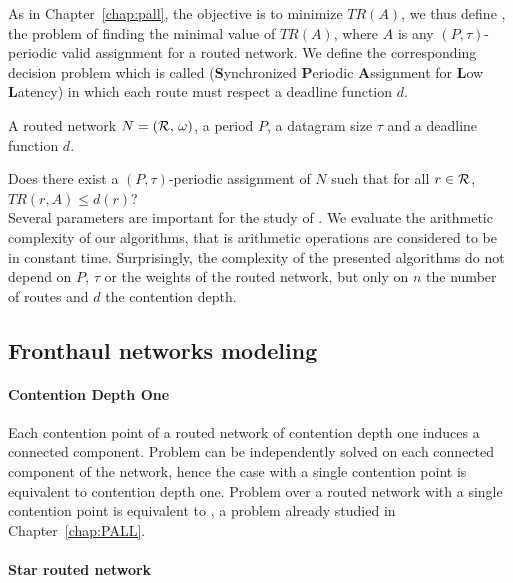   As in Chapter~\ref{chap:pall}, the objective is to minimize $TR(A)$, we thus define \minstra, the problem of finding the minimal value of $TR(A)$, where $A$ is any $(P,\tau)$-periodic valid assignment for a routed network. We define the corresponding decision problem which is called \spall (\textbf{S}ynchronized \textbf{P}eriodic \textbf{A}ssignment for \textbf{L}ow \textbf{L}atency) in which each route must respect a deadline function $d$.


        A routed network $N = ({\cal R},\,\omega)$, a period $P$, a datagram size $\tau$ and a deadline function $d$.%
      

       Does there exist a $(P,\tau)$-periodic assignment of $N$ such that for all $r \in {\cal R}$, $TR(r,A) \leq d(r)$?
      \\
    
    Several parameters are important for the study of \spall. We evaluate the arithmetic complexity of our algorithms, that is arithmetic operations are considered to be in constant time. Surprisingly, the complexity of the presented algorithms do not depend on $P$, $\tau$ or the weights of the routed network, but only on $n$ the number of routes and $d$ the contention depth.

\subsection{Fronthaul networks modeling}\label{sec:fronthaul}

\paragraph*{Contention Depth One}

Each contention point of a routed network of contention depth one induces a connected component. 
Problem \spall can be independently solved on each connected component of the network, hence the case with a single contention point is equivalent to contention depth one. Problem \spall over a routed network with a single contention point is equivalent to \wta, a problem already studied in Chapter~\ref{chap:PALL}. 

\paragraph*{Star routed network}

